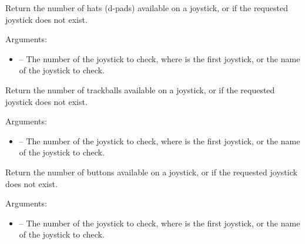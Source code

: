 \documentclass[letterpaper,10pt,english]{sphinxmanual}
\begin{document}

\begin{fulllineitems}
\label{joystick:sge.joystick.get_hats}
Return the number of hats (d-pads) available on a joystick, or 
if the requested joystick does not exist.

Arguments:
\begin{itemize}
\item {} 
 -- The number of the joystick to check, where 
is the first joystick, or the name of the joystick to check.

\end{itemize}

\end{fulllineitems}


\begin{fulllineitems}
\label{joystick:sge.joystick.get_trackballs}
Return the number of trackballs available on a joystick, or  if
the requested joystick does not exist.

Arguments:
\begin{itemize}
\item {} 
 -- The number of the joystick to check, where 
is the first joystick, or the name of the joystick to check.

\end{itemize}

\end{fulllineitems}


\begin{fulllineitems}
\label{joystick:sge.joystick.get_buttons}
Return the number of buttons available on a joystick, or  if
the requested joystick does not exist.

Arguments:
\begin{itemize}
\item {} 
 -- The number of the joystick to check, where 
is the first joystick, or the name of the joystick to check.

\end{itemize}

\end{fulllineitems}
\end{document}
